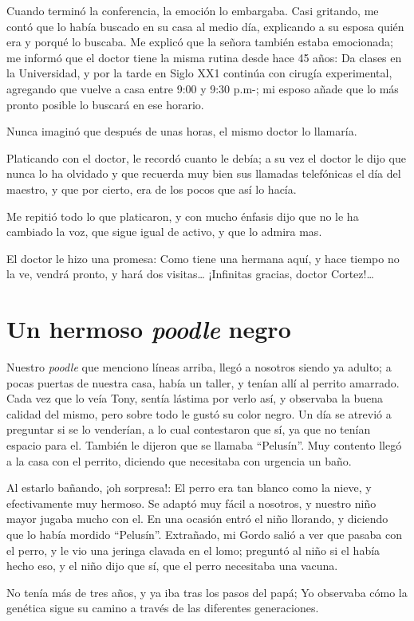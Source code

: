 \documentclass[letterpaper, 12pt]{book}
\begin{document}
Cuando terminó la conferencia, la emoción lo embargaba. Casi gritando, me contó que lo había buscado en su casa al medio día, explicando a su esposa quién era y porqué lo buscaba. Me explicó que la señora también estaba emocionada; me informó que el doctor tiene la misma rutina desde hace 45 años: Da clases en la Universidad, y por la tarde en Siglo XX1 continúa con cirugía experimental, agregando que vuelve a casa entre 9:00 y 9:30 p.m-; mi esposo añade que lo más pronto posible lo buscará en ese horario.

Nunca imaginó que después de unas horas, el mismo doctor lo llamaría.

Platicando con el doctor, le recordó cuanto le debía; a su vez el doctor le dijo que nunca lo ha olvidado y que recuerda muy bien sus llamadas telefónicas el día del maestro, y que por cierto, era de los pocos que así lo hacía.

Me repitió todo lo que platicaron, y con mucho énfasis dijo que no le ha cambiado la voz, que sigue igual de activo, y que lo admira mas.

El doctor le hizo una promesa: Como tiene una hermana aquí, y hace tiempo no la ve, vendrá pronto, y hará dos visitas\ldots
¡Infinitas gracias, doctor Cortez!\ldots
\chapter{Un hermoso \textit{poodle} negro}
Nuestro \textit{poodle} que menciono líneas arriba, llegó a nosotros siendo ya adulto; a pocas puertas de nuestra casa, había un taller, y tenían allí al perrito amarrado. Cada vez que lo veía Tony, sentía lástima por verlo así, y observaba la buena calidad del mismo, pero sobre todo le gustó su color negro. Un día se atrevió a preguntar si se lo venderían, a lo cual contestaron que sí, ya que no tenían espacio para el. También le dijeron que se llamaba ``Pelusín''. Muy contento llegó a la casa con el perrito, diciendo que necesitaba con urgencia un baño.

Al estarlo bañando, ¡oh sorpresa!: El perro era tan blanco como la nieve, y efectivamente muy hermoso. Se adaptó muy fácil a nosotros, y nuestro niño mayor  jugaba mucho con el. En una ocasión entró el niño llorando, y diciendo que lo había mordido ``Pelusín''. Extrañado, mi Gordo salió a ver que pasaba con el perro, y le vio una jeringa clavada en el lomo; preguntó al niño si el había hecho eso, y el niño dijo que sí, que el perro necesitaba una vacuna.

No tenía más de tres años, y ya iba tras los pasos del papá; Yo observaba cómo la genética sigue su camino a través de las diferentes generaciones.
\end{document}
